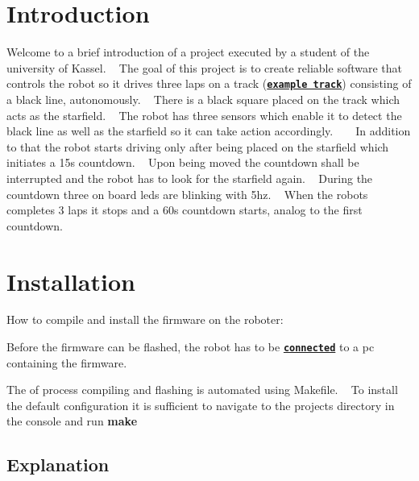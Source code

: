   \hypertarget{index_intro_sec}{}\section{Introduction}\label{index_intro_sec}
Welcome to a brief introduction of a project executed by a student of the university of Kassel. ~\newline
 The goal of this project is to create reliable software that controls the robot so it drives three laps on a track (\href{track_img.jpg}{\tt {\bfseries example track}}) consisting of a black line, autonomously. ~\newline
There is a black square placed on the track which acts as the starfield. ~\newline
The robot has three sensors which enable it to detect the black line as well as the starfield so it can take action accordingly. ~\newline
~\newline
In addition to that the robot starts driving only after being placed on the starfield which initiates a 15s countdown. ~\newline
Upon being moved the countdown shall be interrupted and the robot has to look for the starfield again. ~\newline
During the countdown three on board leds are blinking with 5hz. ~\newline
When the robots completes 3 laps it stops and a 60s countdown starts, analog to the first countdown.\hypertarget{index_install_sec}{}\section{Installation}\label{index_install_sec}
How to compile and install the firmware on the roboter\+:
\begin{DoxyItemize}
\item Before the firmware can be flashed, the robot has to be \href{flashing_process.jpg}{\tt {\bfseries connected}} to a pc containing the firmware.
\item The of process compiling and flashing is automated using Makefile. ~\newline
 To install the default configuration it is sufficient to navigate to the projects directory in the console and run {\bfseries make}
\end{DoxyItemize}\hypertarget{index_Explanation}{}\subsection{Explanation}\label{index_Explanation}

